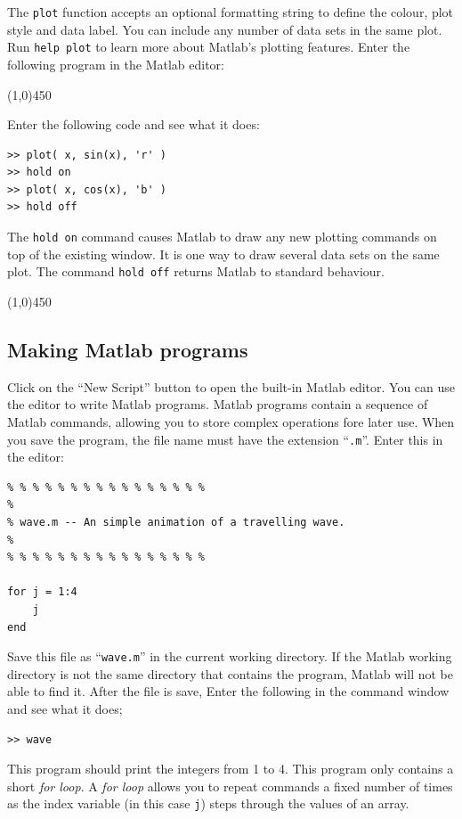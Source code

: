 \documentclass[12pt,a4paper]{article}   %
\newcommand{\code}[1]{\texttt{#1}}
\newcommand{\ruler}{
  \begin{center}
    \line(1,0){450}
  \end{center}
}
\begin{document}
The \code{plot} function accepts an optional formatting string to define the colour, plot
style and data label. You can include any number of data sets in the same plot. Run
\code{help plot} to learn more about Matlab's plotting features. Enter the following
program in the Matlab editor:


\ruler

Enter the following code and see what it does:

\begin{verbatim}
>> plot( x, sin(x), 'r' )
>> hold on
>> plot( x, cos(x), 'b' )
>> hold off
\end{verbatim}

The \code{hold on} command causes Matlab to draw any new plotting commands on top of the
existing window. It is one way to draw several data sets on the same plot. The command
\code{hold off} returns Matlab to standard behaviour.

\ruler

\subsection{Making Matlab programs}

Click on the ``New Script'' button to open the built-in Matlab editor. You can
use the editor to write Matlab programs. Matlab programs contain a sequence
of Matlab commands, allowing you to store complex operations fore later use.
When you save the program, the file name must have the extension ``\code{.m}''.
Enter this in the editor:

\begin{verbatim}
% % % % % % % % % % % % % % % %
% 
% wave.m -- An simple animation of a travelling wave.
% 
% % % % % % % % % % % % % % % %

for j = 1:4
    j
end
\end{verbatim}

Save this file as ``\code{wave.m}'' in the current working directory. If the Matlab working
directory is not the same directory that contains the program, Matlab will not be able to
find it. After the file is save, Enter the following in the command window and see what
it does;

\begin{verbatim}
>> wave
\end{verbatim}

This program should print the integers from 1 to 4. This program only contains a short
\textit{for loop}. A \textit{for loop} allows you to repeat commands a fixed number of
times as the index variable (in this case \code{j}) steps through the values of an array.
\end{document}
